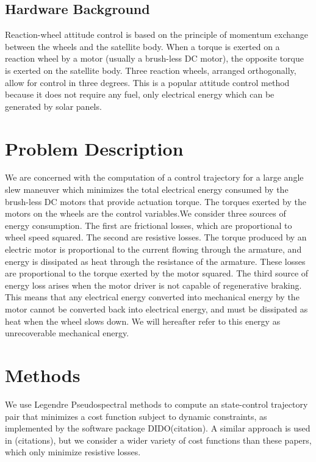 \documentclass[]{aiaa-tc}%
\begin{document}
\subsection{Hardware Background}
Reaction-wheel attitude control is based on the principle of momentum exchange between the wheels and the satellite body. When a torque is exerted on a reaction wheel by a motor (usually a brush-less DC motor), the opposite torque is exerted on the satellite body. Three reaction wheels, arranged orthogonally, allow for control in three degrees. This is a popular attitude control method because it does not require any fuel, only electrical energy which can be generated by solar panels.\\

\section{Problem Description}
We are concerned with the computation of a control trajectory for a large angle slew maneuver which minimizes the total electrical energy consumed by the brush-less DC motors that provide actuation torque. The torques exerted by the motors on the wheels are the control variables.We consider three sources of energy consumption. The first are frictional losses, which are proportional to wheel speed squared. The second are resistive losses. The torque produced by an electric motor is proportional to the current flowing through the armature, and energy is dissipated as heat through the resistance of the armature. These losses are proportional to the torque exerted by the motor squared. The third source of energy loss arises when the motor driver is not capable of regenerative braking. This means that any electrical energy converted into mechanical energy by the motor cannot be converted back into electrical energy, and must be dissipated as heat when the wheel slows down. We will hereafter refer to this energy as unrecoverable mechanical energy.   


\section{Methods}
We use Legendre Pseudospectral methods to compute an state-control trajectory pair that minimizes a cost function subject to dynamic constraints, as implemented by the software package DIDO(citation). A similar approach is used in (citations), but we consider a wider variety of cost functions than these papers, which only minimize resistive losses. 
\end{document}
